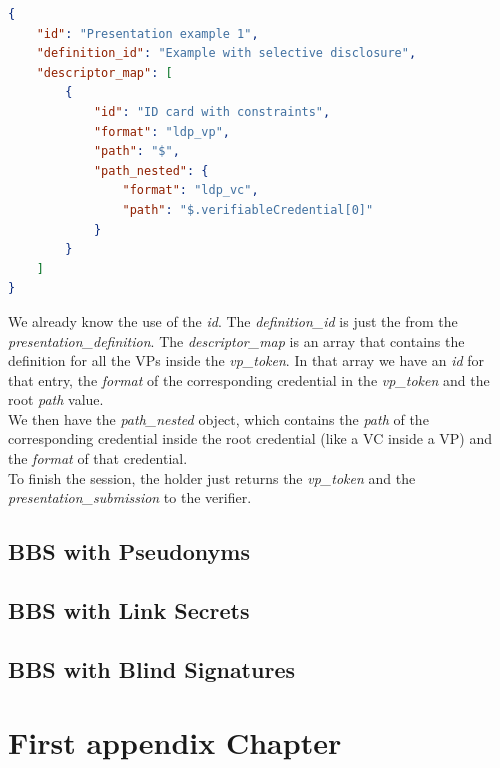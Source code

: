 \documentclass[
	a4paper               %
	,bibliography=totoc   %
	,listof=totoc         %
	,monolingual
	twoside=false,
]{bfhthesis}              %
\begin{document}
\begin{lstlisting}[language=json,firstnumber=1,caption={Example of a presentation submission},captionpos=b, label={list:pressub}]
{
	"id": "Presentation example 1",
	"definition_id": "Example with selective disclosure",
	"descriptor_map": [
		{
			"id": "ID card with constraints",
			"format": "ldp_vp",
			"path": "$",
			"path_nested": {
				"format": "ldp_vc",
				"path": "$.verifiableCredential[0]"
			}
		}
	]
}
\end{lstlisting}

We already know the use of the \textit{id}. The \textit{definition\_id} is just the  from the \textit{presentation\_definition}.
The \textit{descriptor\_map} is an array that contains the definition for all the VPs inside the \textit{vp\_token}.
In that array we have an \textit{id} for that entry, the \textit{format} of the corresponding credential in the \textit{vp\_token} and the root \textit{path} value.\\
We then have the \textit{path\_nested} object, which contains the \textit{path} of the corresponding credential inside the root credential (like a VC inside a VP) and the   \textit{format} of that credential.\\

To finish the session, the holder just returns the \textit{vp\_token} and the \textit{presentation\_submission} to the verifier.


\section{BBS with Pseudonyms}
\label{chap:Pseudonyms}

\section{BBS with Link Secrets}
\label{chap:linksecrets}

\section{BBS with Blind Signatures}
\label{chap:blindsignatures}




\appendix


\chapter{First appendix Chapter}





\end{document}
